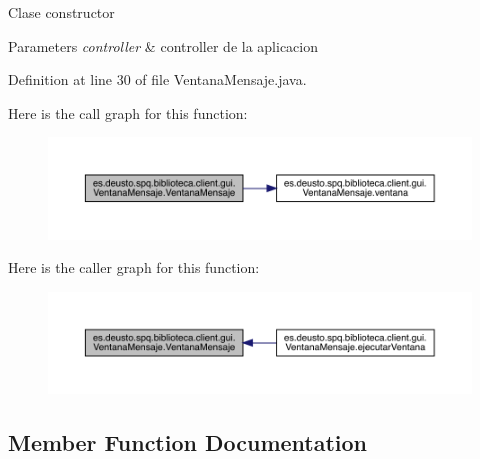 Clase constructor 
\begin{DoxyParams}{Parameters}
{\em controller} & controller de la aplicacion \\
\hline
\end{DoxyParams}


Definition at line 30 of file Ventana\+Mensaje.\+java.

Here is the call graph for this function\+:
\nopagebreak
\begin{figure}[H]
\begin{center}
\leavevmode
\includegraphics[width=350pt]{classes_1_1deusto_1_1spq_1_1biblioteca_1_1client_1_1gui_1_1_ventana_mensaje_a8538474416f67bac3e0077d5f2f25871_cgraph}
\end{center}
\end{figure}
Here is the caller graph for this function\+:
\nopagebreak
\begin{figure}[H]
\begin{center}
\leavevmode
\includegraphics[width=350pt]{classes_1_1deusto_1_1spq_1_1biblioteca_1_1client_1_1gui_1_1_ventana_mensaje_a8538474416f67bac3e0077d5f2f25871_icgraph}
\end{center}
\end{figure}


\subsection{Member Function Documentation}
\mbox{\label{classes_1_1deusto_1_1spq_1_1biblioteca_1_1client_1_1gui_1_1_ventana_mensaje_ac2c22018c35286343654d228dc5010cb}} 
